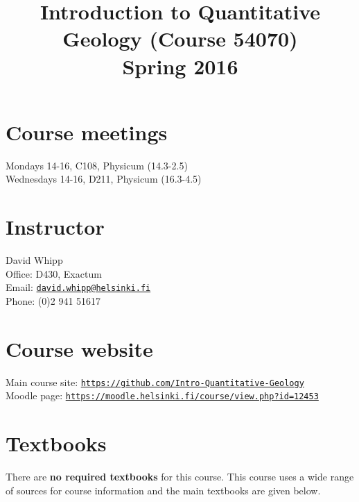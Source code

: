 \documentclass[11pt,a4paper]{article}
\begin{document}
\title{Introduction to Quantitative Geology (Course 54070)\\Spring 2016}
\author{}
\date{}
\maketitle

\section*{Course meetings}
Mondays 14-16, C108, Physicum (14.3-2.5)\\
Wednesdays 14-16, D211, Physicum (16.3-4.5)

\section*{Instructor}
David Whipp\\
Office: D430, Exactum\\
Email: \href{mailto:david.whipp@helsinki.fi}{\texttt{david.whipp@helsinki.fi}}\\
Phone: (0)2 941 51617

\section*{Course website}
Main course site: \href{https://github.com/Intro-Quantitative-Geology}{\texttt{https://github.com/Intro-Quantitative-Geology}}\\
Moodle page: \href{https://moodle.helsinki.fi/course/view.php?id=12453}{\texttt{https://moodle.helsinki.fi/course/view.php?id=12453}}

\section*{Textbooks}
There are \textbf{no required textbooks} for this course. This course uses a wide range of sources for course information and the main textbooks are given below.\\
\end{document}

